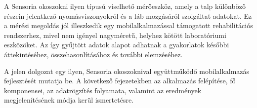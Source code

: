 A Sensoria okoszokni ilyen típusú viselhető mérőeszköz, amely a talp különböző részein
jelentkező nyomásviszonyokról és a láb mozgásáról szolgáltat adatokat. \cite{sensoria2016walk}
Ez a mérési megoldás jól illeszkedik egy mobilalkalmazással támogatott rehabilitációs rendszerhez,
mivel nem igényel nagyméretű, helyhez kötött laboratóriumi eszközöket.
Az így gyűjtött adatok alapot adhatnak a gyakorlatok későbbi áttekintéséhez, összehasonlításához
és további elemzéséhez.


A jelen dolgozat egy ilyen, Sensoria okoszoknival együttműködő mobilalkalmazás fejlesztését
mutatja be. A következő fejezetekben az alkalmazás felépítése, fő komponensei, az adatrögzítés
folyamata, valamint az eredmények megjelenítésének módja kerül ismertetésre.
















